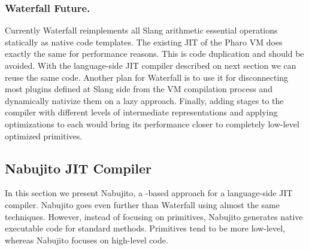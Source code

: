 \subsubsection{Waterfall Future.}
Currently Waterfall reimplements all Slang arithmetic essential operations statically as native code templates.
The existing JIT of the Pharo VM does exactly the same for performance reasons.
This is code duplication and should be avoided.
With the language-side JIT compiler described on next section we can reuse the same code. Another plan for Waterfall is to use it for disconnecting most plugins defined at Slang side from the VM compilation process and dynamically nativize them on a lazy approach.
Finally, adding stages to the compiler with different levels of intermediate representations and applying optimizations to each would bring its performance closer to completely low-level optimized primitives.




\subsection{Nabujito JIT Compiler}
In this section we present Nabujito, a \B-based approach for a language-side JIT compiler.
Nabujito goes even further than Waterfall using almost the same techniques.
However, instead of focusing on primitives, Nabujito generates native executable code for standard \ST methods.
Primitives tend to be more low-level, whereas Nabujito focuses on high-level \ST code. 


